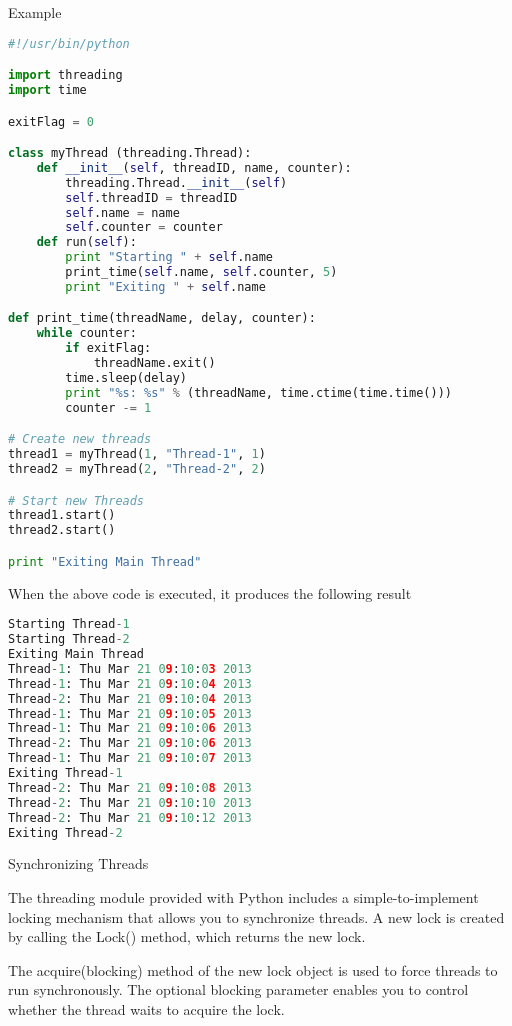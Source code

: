 Example

\begin{lstlisting}[language=Python]
#!/usr/bin/python

import threading
import time

exitFlag = 0

class myThread (threading.Thread):
    def __init__(self, threadID, name, counter):
        threading.Thread.__init__(self)
        self.threadID = threadID
        self.name = name
        self.counter = counter
    def run(self):
        print "Starting " + self.name
        print_time(self.name, self.counter, 5)
        print "Exiting " + self.name

def print_time(threadName, delay, counter):
    while counter:
        if exitFlag:
            threadName.exit()
        time.sleep(delay)
        print "%s: %s" % (threadName, time.ctime(time.time()))
        counter -= 1

# Create new threads
thread1 = myThread(1, "Thread-1", 1)
thread2 = myThread(2, "Thread-2", 2)

# Start new Threads
thread1.start()
thread2.start()

print "Exiting Main Thread"
\end{lstlisting}

When the above code is executed, it produces the following result

\begin{lstlisting}[language=Python]
Starting Thread-1
Starting Thread-2
Exiting Main Thread
Thread-1: Thu Mar 21 09:10:03 2013
Thread-1: Thu Mar 21 09:10:04 2013
Thread-2: Thu Mar 21 09:10:04 2013
Thread-1: Thu Mar 21 09:10:05 2013
Thread-1: Thu Mar 21 09:10:06 2013
Thread-2: Thu Mar 21 09:10:06 2013
Thread-1: Thu Mar 21 09:10:07 2013
Exiting Thread-1
Thread-2: Thu Mar 21 09:10:08 2013
Thread-2: Thu Mar 21 09:10:10 2013
Thread-2: Thu Mar 21 09:10:12 2013
Exiting Thread-2
\end{lstlisting}

Synchronizing Threads

The threading module provided with Python includes a simple-to-implement locking mechanism that allows you to synchronize threads. A new lock is created by calling the Lock() method, which returns the new lock.

The acquire(blocking) method of the new lock object is used to force threads to run synchronously. The optional blocking parameter enables you to control whether the thread waits to acquire the lock.

